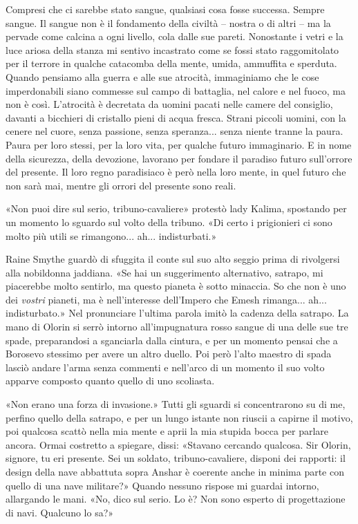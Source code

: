 Compresi che ci sarebbe stato sangue, qualsiasi cosa fosse successa.
Sempre sangue. Il sangue non è il fondamento della civiltà -- nostra o
di altri -- ma la pervade come calcina a ogni livello, cola dalle sue
pareti. Nonostante i vetri e la luce ariosa della stanza mi sentivo
incastrato come se fossi stato raggomitolato per il terrore in qualche
catacomba della mente, umida, ammuffita e sperduta. Quando pensiamo alla
guerra e alle sue atrocità, immaginiamo che le cose imperdonabili siano
commesse sul campo di battaglia, nel calore e nel fuoco, ma non è così.
L'atrocità è decretata da uomini pacati nelle camere del consiglio,
davanti a bicchieri di cristallo pieni di acqua fresca. Strani piccoli
uomini, con la cenere nel cuore, senza passione, senza speranza... senza
niente tranne la paura. Paura per loro stessi, per la loro vita, per
qualche futuro immaginario. E in nome della sicurezza, della devozione,
lavorano per fondare il paradiso futuro sull'orrore del presente. Il
loro regno paradisiaco è però nella loro mente, in quel futuro che non
sarà mai, mentre gli orrori del presente sono reali.

«Non puoi dire sul serio, tribuno-cavaliere» protestò lady Kalima,
spostando per un momento lo sguardo sul volto della tribuno. «Di certo i
prigionieri ci sono molto più utili se rimangono... ah... indisturbati.»

Raine Smythe guardò di sfuggita il conte sul suo alto seggio prima di
rivolgersi alla nobildonna jaddiana. «Se hai un suggerimento
alternativo, satrapo, mi piacerebbe molto sentirlo, ma questo pianeta è
sotto minaccia. So che non è uno dei \emph{vostri} pianeti, ma è
nell'interesse dell'Impero che Emesh rimanga... ah... indisturbato.» Nel
pronunciare l'ultima parola imitò la cadenza della satrapo. La mano di
Olorin si serrò intorno all'impugnatura rosso sangue di una delle sue
tre spade, preparandosi a sganciarla dalla cintura, e per un momento
pensai che a Borosevo stessimo per avere un altro duello. Poi però
l'alto maestro di spada lasciò andare l'arma senza commenti e nell'arco
di un momento il suo volto apparve composto quanto quello di uno
scoliasta.

«Non erano una forza di invasione.» Tutti gli sguardi si concentrarono
su di me, perfino quello della satrapo, e per un lungo istante non
riuscii a capirne il motivo, poi qualcosa scattò nella mia mente e aprii
la mia stupida bocca per parlare ancora. Ormai costretto a spiegare,
dissi: «Stavano cercando qualcosa. Sir Olorin, signore, tu eri presente.
Sei un soldato, tribuno-cavaliere, disponi dei rapporti: il design della
nave abbattuta sopra Anshar è coerente anche in minima parte con quello
di una nave militare?» Quando nessuno rispose mi guardai intorno,
allargando le mani. «No, dico sul serio. Lo è? Non sono esperto di
progettazione di navi. Qualcuno lo sa?»

